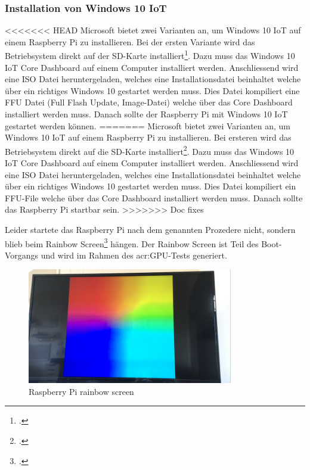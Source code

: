 \subsubsection{Installation von Windows 10 IoT}
<<<<<<< HEAD
Microsoft bietet zwei Varianten an, um Windows 10 IoT auf einem Raspberry Pi zu installieren. Bei der ersten Variante wird das Betriebsystem direkt auf der SD-Karte installiert\footcite{install_win10iot_2016-04-25}. Dazu muss das Windows 10 IoT Core Dashboard auf einem Computer installiert werden. Anschliessend wird eine ISO Datei heruntergeladen, welches eine Installationsdatei beinhaltet welche über ein richtiges Windows 10 gestartet werden muss. Dies Datei kompiliert eine FFU Datei (Full Flash Update, Image-Datei) welche über das Core Dashboard installiert werden muss. Danach sollte der Raspberry Pi mit Windows 10 IoT gestartet werden können. 
=======
Microsoft bietet zwei Varianten an, um Windows 10 IoT auf einem Raspberry Pi zu installieren. Bei ersteren wird das Betriebsystem direkt auf die SD-Karte installiert\footcite{install_win10iot_2016-04-25}. Dazu muss das Windows 10 IoT Core Dashboard auf einem Computer installiert werden. Anschliessend wird eine ISO Datei heruntergeladen, welches eine Installationsdatei beinhaltet welche über ein richtiges Windows 10 gestartet werden muss. Dies Datei kompiliert ein FFU-File welche über das Core Dashboard installiert werden muss. Danach sollte das Raspberry Pi startbar sein. 
>>>>>>> Doc fixes

Leider startete das Raspberry Pi nach dem genannten Prozedere nicht, sondern blieb beim Rainbow Screen\footcite{RPi_Rainbowscreen_2016-04-25} hängen. Der Rainbow Screen ist Teil des Boot-Vorgangs und wird im Rahmen des \gls{acr:GPU}-Tests generiert.

\begin{figure}[H]
  \centering
  \includegraphics[width=0.8\textwidth]{./images/raspberry-rainbow-screen.png}
  \caption{Raspberry Pi rainbow screen}
\end{figure}


